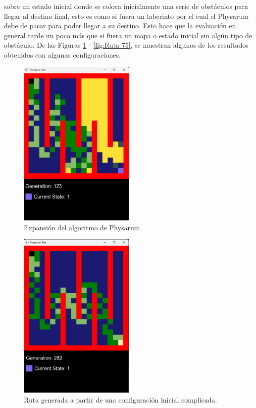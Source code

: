         sobre un estado inicial donde se coloca inicialmente una
        serie de obst\'aculos para llegar al destino final, esto es como
        si fuera un laberinto por el cual el Physarum debe de pasar
        para poder llegar a su destino. Esto hace que la evaluaci\'on
        en general tarde un poco m\'as que si fuera un mapa o estado
        inicial sin alg\'un tipo de obst\'aculo.
    \vskip 0.5cm
    De las Figuras \ref{fig:Ruta 61} - \ref{fig:Ruta 75}, se muestran algunos de los resultados
        obtenidos con algunas configuraciones.
    \vskip 0.5cm
    \begin{figure}[htbp]
        \centering
        \includegraphics[width=0.5\textwidth]{./images/Pruebas/simulador/image061.png}
        \caption{Expansi\'on del algoritmo de Physarum.}
        \label{fig:Ruta 61}
    \end{figure}
    \vskip 0.5cm
    \begin{figure}[htbp]
        \centering
        \includegraphics[width=0.5\textwidth]{./images/Pruebas/simulador/image063.png}
        \caption{Ruta generada a partir de una configuraci\'on inicial complicada.}
        \label{fig:Ruta 63}
    \end{figure}

